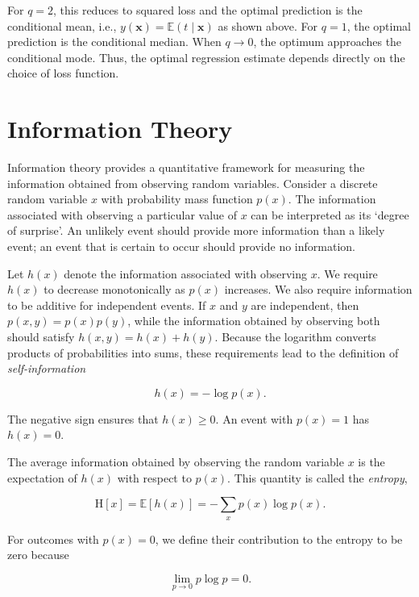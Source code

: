 \documentclass[10pt,twocolumn]{memoir}
\begin{document}
For $q=2$, this reduces to squared loss and the optimal prediction is the conditional mean, i.e., $y(\mathbf{x}) = \mathbb{E}(t\mid\mathbf{x})$ as shown above. For $q=1$, the optimal prediction is the conditional median. When $q\rightarrow 0$, the optimum approaches the conditional mode. Thus, the optimal regression estimate depends directly on the choice of loss function.

\section{Information Theory}

Information theory provides a quantitative framework for measuring the information obtained from observing random variables. Consider a discrete random variable $x$ with probability mass function $p(x)$. The information associated with observing a particular value of $x$ can be interpreted as its `degree of surprise'. An unlikely event should provide more information than a likely event; an event that is certain to occur should provide no information.

Let $h(x)$ denote the information associated with observing $x$. We require $h(x)$ to decrease monotonically as $p(x)$ increases. We also require information to be additive for independent events. If $x$ and $y$ are independent, then $p(x,y) = p(x)p(y)$, while the information obtained by observing both should satisfy $h(x,y) = h(x) + h(y)$. Because the logarithm converts products of probabilities into sums, these requirements lead to the definition of \textit{self-information}

\begin{equation}
    h(x) = -\log p(x).
\end{equation}

The negative sign ensures that $h(x)\geq 0$. An event with $p(x)=1$ has $h(x)=0$.

The average information obtained by observing the random variable $x$ is the expectation of $h(x)$ with respect to $p(x)$. This quantity is called the \textit{entropy},

\begin{equation}
    \mathrm{H}[x] = \mathbb{E}[h(x)] = -\sum_x p(x)\log p(x).
\end{equation}

For outcomes with $p(x)=0$, we define their contribution to the entropy to be zero because

\begin{equation}
    \lim_{p\rightarrow 0} p\log p = 0.
\end{equation}
\end{document}
